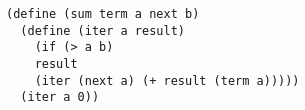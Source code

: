 \documentclass[a4paper,12pt]{article}
\begin{document}
\begin{lstlisting}
(define (sum term a next b)
  (define (iter a result)
    (if (> a b)
	result
	(iter (next a) (+ result (term a)))))
  (iter a 0))
\end{lstlisting}
\end{document}
